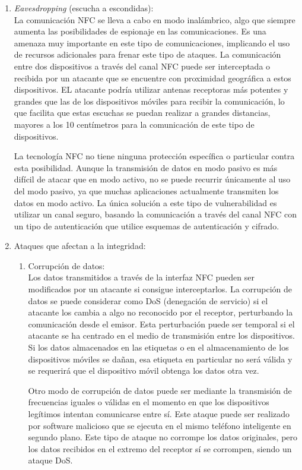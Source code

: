 \documentclass[12pt,a4paper,onecolumn,oneside]{report}
\begin{document}
\begin{enumerate}

\item \textit{Eavesdropping} (escucha a escondidas):\\
La comunicación NFC se lleva a cabo en modo inalámbrico, algo que siempre aumenta las posibilidades de espionaje en las comunicaciones. Es una amenaza muy importante en este tipo de comunicaciones, implicando el uso de recursos adicionales para frenar este tipo de ataques.  La comunicación entre dos dispositivos a través del canal NFC puede ser interceptada o recibida por un atacante que se encuentre con proximidad geográfica a estos dispositivos. EL atacante podría utilizar antenas receptoras más potentes y grandes que las de los dispositivos móviles para recibir la comunicación, lo que facilita que estas escuchas se puedan realizar a grandes distancias, mayores a los 10 centímetros para la comunicación de este tipo de dispositivos. 

La tecnología NFC no tiene ninguna protección específica o particular contra esta posibilidad. Aunque la transmisión de datos en modo pasivo es más difícil de atacar que en modo activo, no se puede recurrir únicamente al uso del modo pasivo, ya que muchas aplicaciones actualmente transmiten los datos en modo activo. La única solución a este tipo de vulnerabilidad es utilizar un canal seguro, basando la comunicación a través del canal NFC con un tipo de autenticación que utilice esquemas de autenticación y cifrado.


\item Ataques que afectan a la integridad:\\
\begin{enumerate}

\item Corrupción de datos:\\
Los datos transmitidos a través de la interfaz NFC pueden ser modificados por un atacante si consigue interceptarlos. La corrupción de datos se puede considerar como DoS (denegación de servicio) si el atacante los cambia a algo no reconocido por el receptor, perturbando la comunicación desde el emisor. Esta perturbación puede ser temporal si el atacante se ha centrado en el medio de transmisión entre los dispositivos. Si los datos almacenados en las etiquetas o en el almacenamiento de los dispositivos móviles se dañan, esa etiqueta en particular no será válida y se requerirá que el dispositivo móvil obtenga los datos otra vez.

Otro modo de corrupción de datos puede ser mediante la transmisión de frecuencias iguales o válidas en el momento en que los dispositivos legítimos intentan comunicarse entre sí. Este ataque puede ser realizado por software malicioso que se ejecuta en el mismo teléfono inteligente en segundo plano. Este tipo de ataque no corrompe los datos originales, pero los datos recibidos en el extremo del receptor sí se corrompen, siendo un ataque DoS. 


\end{enumerate}
\end{enumerate}
\end{document}
